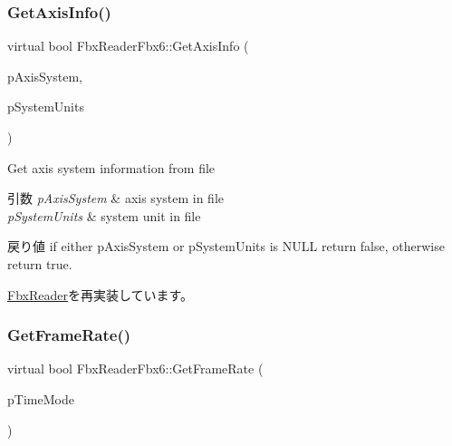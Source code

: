 \mbox{\label{class_fbx_reader_fbx6_ab8e2b6c8c2b0b081b615cd4969af32cb}} 
\subsubsection{\texorpdfstring{Get\+Axis\+Info()}{GetAxisInfo()}}
{\footnotesize\ttfamily virtual bool Fbx\+Reader\+Fbx6\+::\+Get\+Axis\+Info (\begin{DoxyParamCaption}\item[{\hyperlink{class_fbx_axis_system}{Fbx\+Axis\+System} $\ast$}]{p\+Axis\+System,  }\item[{\hyperlink{class_fbx_system_unit}{Fbx\+System\+Unit} $\ast$}]{p\+System\+Units }\end{DoxyParamCaption})\hspace{0.3cm}{\ttfamily [virtual]}}

Get axis system information from file 
\begin{DoxyParams}{引数}
{\em p\+Axis\+System} & axis system in file \\
\hline
{\em p\+System\+Units} & system unit in file \\
\hline
\end{DoxyParams}
\begin{DoxyReturn}{戻り値}
if either p\+Axis\+System or p\+System\+Units is {\ttfamily N\+U\+LL} return {\ttfamily false}, otherwise return {\ttfamily true}. 
\end{DoxyReturn}


\hyperlink{class_fbx_reader_a73e58c3f7734250f0f8ffaef96b2df3f}{Fbx\+Reader}を再実装しています。

\mbox{\label{class_fbx_reader_fbx6_ad4ae4c4949d316491f937a0ff75c6ed7}} 
\subsubsection{\texorpdfstring{Get\+Frame\+Rate()}{GetFrameRate()}}
{\footnotesize\ttfamily virtual bool Fbx\+Reader\+Fbx6\+::\+Get\+Frame\+Rate (\begin{DoxyParamCaption}\item[{\hyperlink{class_fbx_time_acc529b00a0e8d4c3da3702449ca93031}{Fbx\+Time\+::\+E\+Mode} \&}]{p\+Time\+Mode }\end{DoxyParamCaption})\hspace{0.3cm}{\ttfamily [virtual]}}

